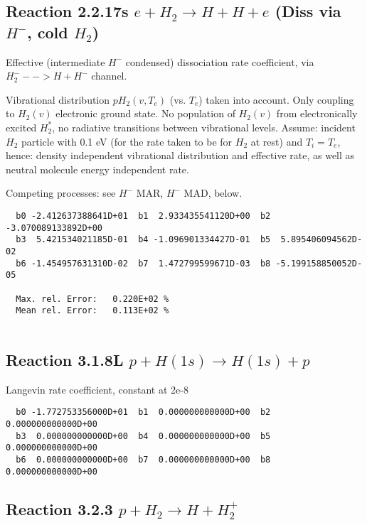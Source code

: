 \documentclass[12pt,dvipdfmx]{article}
\begin{document}
\subsection{
Reaction 2.2.17s  $e + H_2 \rightarrow H + H +e $  (Diss via $H^-$, cold $H_2$)
}
Effective (intermediate $H^-$ condensed) dissociation rate coefficient,
via $H_2^- --> H + H^-$ channel.


Vibrational distribution $pH_2(v,T_e)$ (vs. $T_e$) taken into
account. Only coupling
to $H_2(v)$ electronic ground state. No population of $H_2(v)$ from electronically
excited $H_2^*$, no radiative transitions between vibrational levels.
Assume: incident $H_2$ particle with 0.1 eV
(for the rate taken to be for $H_2$ at rest) and $T_i = T_e$,
hence: density independent vibrational distribution and effective
rate, as well as neutral molecule energy independent rate.

Competing processes: see $H^-$ MAR,  $H^-$ MAD, below.

\begin{small}\begin{verbatim}
  b0 -2.412637388641D+01  b1  2.933435541120D+00  b2 -3.070089133892D+00
  b3  5.421534021185D-01  b4 -1.096901334427D-01  b5  5.895406094562D-02
  b6 -1.454957631310D-02  b7  1.472799599671D-03  b8 -5.199158850052D-05

  Max. rel. Error:   0.220E+02 %
  Mean rel. Error:   0.113E+02 %


\end{verbatim}\end{small}

\subsection{
Reaction 3.1.8L   $p + H(1s) \rightarrow H(1s) + p  $
}
Langevin rate coefficient, constant at 2e-8


\begin{small}\begin{verbatim}
  b0 -1.772753356000D+01  b1  0.000000000000D+00  b2  0.000000000000D+00
  b3  0.000000000000D+00  b4  0.000000000000D+00  b5  0.000000000000D+00
  b6  0.000000000000D+00  b7  0.000000000000D+00  b8  0.000000000000D+00
\end{verbatim}\end{small}


\subsection{
Reaction 3.2.3   $p + H_2 \rightarrow H + H_2^+  $
}
\end{document}

